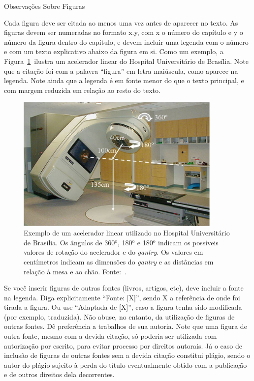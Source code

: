 \documentclass[a4paper, 12pt]{ppgeb}
\makeatletter
\renewcommand{\section}{\@startsection
{section}
{1}
{0mm}
{-\baselineskip}
{0.5\baselineskip}
{\large\bfseries\scshape}}
\makeatother
\begin{document}
\section{Observações Sobre Figuras}

Cada figura deve ser citada ao menos uma vez antes de aparecer no texto. As figuras devem ser numeradas no formato x.y, com x o número do capítulo e y o número da figura dentro do capítulo, e devem incluir uma legenda com o número e com um texto explicativo abaixo da figura em si. Como um exemplo, a Figura~\ref{fig:acelerador} ilustra um acelerador linear do Hospital Universitário de Brasília. Note que a citação foi com a palavra ``figura'' em letra maiúscula, como aparece na legenda. Note ainda que a legenda é em fonte menor do que o texto principal, e com margem reduzida em relação ao resto do texto.

\begin{figure}[h]
\centering
\includegraphics[width=100mm]{Acelerador2}
\caption[Exemplo de um acelerador linear utilizado no Hospital Universitário de Brasília.]{Exemplo de um acelerador linear utilizado no Hospital Universitário de Brasília. Os ângulos de 360${^{\textrm{o}} }$, 180${^{\textrm{o}} }$ e 180${^{\textrm{o}} }$ indicam os possíveis valores de rotação do acelerador e do \emph{gantry}. Os valores em centímetros indicam as dimensões do \emph{gantry} e as distâncias em relação à mesa e ao chão. Fonte:~\cite{Avelino2013}.}\label{fig:acelerador}
\end{figure}

Se você inserir figuras de outras fontes (livros, artigos, etc), deve incluir a fonte na legenda. Diga explicitamente ``Fonte: [X]'', sendo X a referência de onde foi tirada a figura. Ou use ``Adaptada de [X]'', caso a figura tenha sido modificada (por exemplo, traduzida). Não abuse, no entanto, da utilização de figuras de outras fontes. Dê preferência a trabalhos de sua autoria. Note que uma figura de outra fonte, mesmo com a devida citação, só poderia ser utilizada com autorização por escrito, para evitar processo por direitos autorais. Já o caso de inclusão de figuras de outras fontes sem a devida citação constitui plágio, sendo o autor do plágio sujeito à perda do título eventualmente obtido com a publicação e de outros direitos dela decorrentes.
\end{document}

